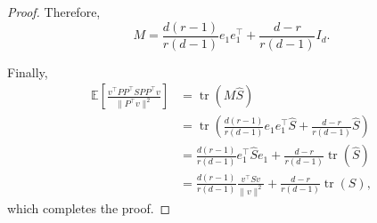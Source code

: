 \documentclass[10pt]{article}
\begin{document}
\begin{proof}
Therefore,
\[
M
= \frac{d(r-1)}{r(d-1)} e_1e_1^\top
+ \frac{d-r}{r(d-1)} I_d.
\]

Finally,
\begin{align*}
\mathbb{E}\!\left[\frac{v^\top PP^\top S PP^\top v}{\|P^\top v\|^2}\right]
&= \operatorname{tr}(M\hat S) \\
&= \operatorname{tr}\!\left(
\frac{d(r-1)}{r(d-1)} e_1e_1^\top \hat S
+ \frac{d-r}{r(d-1)} \hat S
\right) \\
&= \frac{d(r-1)}{r(d-1)} e_1^\top \hat S e_1
+ \frac{d-r}{r(d-1)} \operatorname{tr}(\hat S) \\
&= \frac{d(r-1)}{r(d-1)} \frac{v^\top S v}{\|v\|^2}
+ \frac{d-r}{r(d-1)} \operatorname{tr}(S),
\end{align*}
which completes the proof.
\end{proof}
\end{document}
